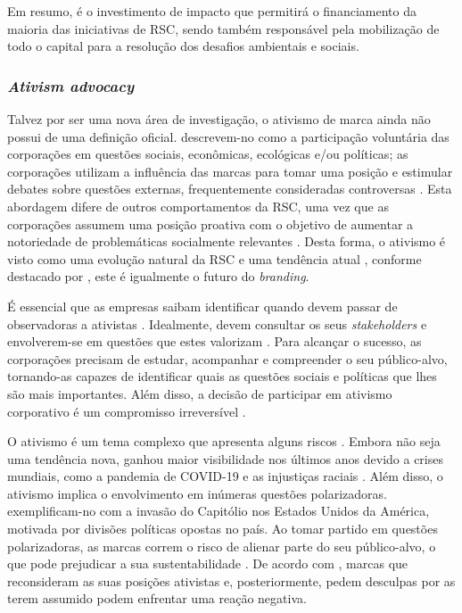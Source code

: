 \documentclass[portuguese]{textolivre}
\begin{document}
Em resumo, é o investimento de impacto que permitirá o financiamento da maioria das iniciativas de RSC, sendo também responsável pela mobilização de todo o capital para a resolução dos desafios ambientais e sociais.

\subsubsection{\textit{Ativism advocacy}}\label{sec-autores}
Talvez por ser uma nova área de investigação, o ativismo de marca ainda não possui de uma definição oficial. \textcite{kotler_brand_2018} descrevem-no como a participação voluntária das corporações em questões sociais, econômicas, ecológicas e/ou políticas; as corporações utilizam a influência das marcas para tomar uma posição e estimular debates sobre questões externas, frequentemente consideradas controversas \cite{kotler_marketing_2022}. Esta abordagem difere de outros comportamentos da RSC, uma vez que as corporações assumem uma posição proativa com o objetivo de aumentar a notoriedade de problemáticas socialmente relevantes \cite{korschun_brand_2021}. Desta forma, o ativismo é visto como uma evolução natural da RSC e uma tendência atual \cite{korschun_brand_2021,kotler_marketing_2022}, conforme destacado por \textcite{kotler_brand_2018}, este é igualmente o futuro do \textit{branding}.

É essencial que as empresas saibam identificar quando devem passar de observadoras a ativistas \cite{ghosh_when_2021}. Idealmente, devem consultar os seus \textit{stakeholders} e envolverem-se em questões que estes valorizam \cite{korschun_brand_2021}. Para alcançar o sucesso, as corporações precisam de estudar, acompanhar e compreender o seu público-alvo, tornando-as capazes de identificar quais as questões sociais e políticas que lhes são mais importantes. Além disso, a decisão de participar em ativismo corporativo é um compromisso irreversível \cite{kotler_marketing_2022}.

O ativismo é um tema complexo que apresenta alguns riscos \cite{mukherjee_brand_2020}. Embora não seja uma tendência nova, ganhou maior visibilidade nos últimos anos devido a crises mundiais, como a pandemia de COVID-19 e as injustiças raciais \cite{korschun_brand_2021}. Além disso, o ativismo implica o envolvimento em inúmeras questões polarizadoras. \textcite{lekakis_consumer_2022} exemplificam-no com a invasão do Capitólio nos Estados Unidos da América, motivada por divisões políticas opostas no país. Ao tomar partido em questões polarizadoras, as marcas correm o risco de alienar parte do seu público-alvo, o que pode prejudicar a sua sustentabilidade \cite{ortegon_danger_2019}. De acordo com \textcite{mukherjee_brand_2020}, marcas que reconsideram as suas posições ativistas e, posteriormente, pedem desculpas por as terem assumido podem enfrentar uma reação negativa.
\end{document}
